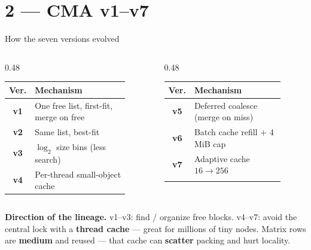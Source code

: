 \section{2 --- CMA v1--v7}

\begin{frame}{How the seven versions evolved}
    \begin{columns}[T]
        \begin{column}{0.48\textwidth}
            {\scriptsize
            \renewcommand{\arraystretch}{1.45}
            \begin{tabular}{@{}c p{0.82\linewidth}@{}}
                \toprule
                \textbf{Ver.} & \textbf{Mechanism} \\
                \midrule
                \textbf{v1} & One free list, first-fit, merge on free \\
                \textbf{v2} & Same list, best-fit \\
                \textbf{v3} & \(\log_2\) size bins (less search) \\
                \textbf{v4} & Per-thread small-object cache \\
                \bottomrule
            \end{tabular}
            }
        \end{column}
        \begin{column}{0.48\textwidth}
            {\scriptsize
            \renewcommand{\arraystretch}{1.45}
            \begin{tabular}{@{}c p{0.82\linewidth}@{}}
                \toprule
                \textbf{Ver.} & \textbf{Mechanism} \\
                \midrule
                \textbf{v5} & Deferred coalesce (merge on miss) \\
                \textbf{v6} & Batch cache refill + 4\,MiB cap \\
                \textbf{v7} & Adaptive cache \(16\rightarrow256\) \\
                & \\
                \bottomrule
            \end{tabular}
            }
        \end{column}
    \end{columns}

    \vspace{0.7em}
    {\footnotesize
    \textbf{Direction of the lineage.}
    v1--v3: find / organize free blocks.
    v4--v7: avoid the central lock with a \textbf{thread cache}
    --- great for millions of tiny nodes.
    Matrix rows are \textbf{medium} and reused --- that cache can
    \textbf{scatter} packing and hurt locality.
    }
\end{frame}
